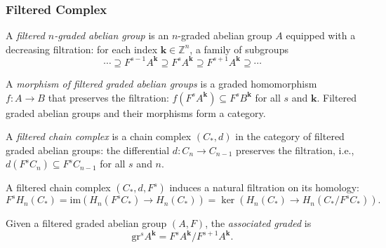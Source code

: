 \subsubsection{Filtered Complex}\label{sec:prereq-filtered-complex}

\begin{definition}\label{prereq:def:filtration}
    \leanok
    A \emph{filtered $n$-graded abelian group} is an $n$-graded abelian group $A$ equipped with a decreasing filtration: for each index $\mathbf{k} \in \mathbb{Z}^n$, a family of subgroups
    $$\cdots \supseteq F^{s-1} A^{\mathbf{k}} \supseteq F^s A^{\mathbf{k}} \supseteq F^{s+1} A^{\mathbf{k}} \supseteq \cdots$$
\end{definition}

\begin{definition}\label{prereq:def:filtered-morphism}
    \leanok
    A \emph{morphism of filtered graded abelian groups} is a graded homomorphism $f: A \to B$ that preserves the filtration: $f(F^s A^{\mathbf{k}}) \subseteq F^s B^{\mathbf{k}}$ for all $s$ and $\mathbf{k}$. Filtered graded abelian groups and their morphisms form a category.
\end{definition}

\begin{definition}\label{prereq:def:filtered-complex}
    \leanok
    A \emph{filtered chain complex} is a chain complex $(C_*, d)$ in the category of filtered graded abelian groups: the differential $d: C_n \to C_{n-1}$ preserves the filtration, i.e., $d(F^s C_n) \subseteq F^s C_{n-1}$ for all $s$ and $n$.
\end{definition}

\begin{proposition}\label{prereq:prop:homology-filtration}
    \leanok
    A filtered chain complex $(C_*, d, F^s)$ induces a natural filtration on its homology:
    $$F^s H_n(C_*) = \mathrm{im}(H_n(F^s C_*) \to H_n(C_*)) = \ker(H_n(C_*) \to H_n(C_* / F^s C_*)).$$
\end{proposition}

\begin{definition}\label{prereq:def:associated-graded}
    \leanok
    Given a filtered graded abelian group $(A, F)$, the \emph{associated graded} is
    $$\mathrm{gr}^s A^{\mathbf{k}} = F^s A^{\mathbf{k}} / F^{s+1} A^{\mathbf{k}}.$$
\end{definition}


